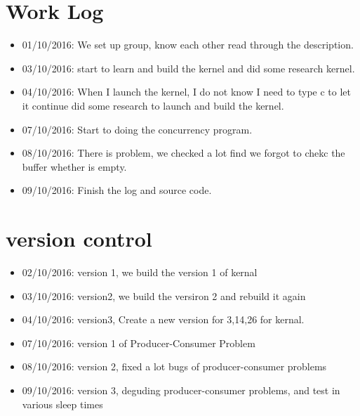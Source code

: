 \documentclass[letterpaper,10pt]{article}
\begin{document}
\section{Work Log}
    \begin{itemize}
    \item 01/10/2016: We set up group, know each other read through the description.\\
    \item 03/10/2016: start to learn and build the kernel and did some research kernel.\\
    \item 04/10/2016: When I launch the kernel, I do not know I need to type c to let it continue did some research to launch and build the kernel.\\
    \item 07/10/2016: Start to doing the concurrency program.\\
    \item 08/10/2016: There is problem, we checked a lot find we forgot to chekc the buffer whether is empty.\\
    \item 09/10/2016: Finish the log and source code.\\

    \end{itemize}   
    

\section{version control}
    \begin{itemize}
    \item 02/10/2016: version 1, we build the version 1 of kernal\\
    \item 03/10/2016: version2, we build the versiron 2 and rebuild it again\\
    \item 04/10/2016: version3, Create a new version for 3,14,26 for kernal.\\
    \item 07/10/2016: version 1 of Producer-Consumer Problem\\
    \item 08/10/2016: version 2, fixed a lot bugs of producer-consumer problems\\
    \item 09/10/2016: version 3, deguding producer-consumer problems, and test in various sleep times\\

    \end{itemize} 
\end{document}
